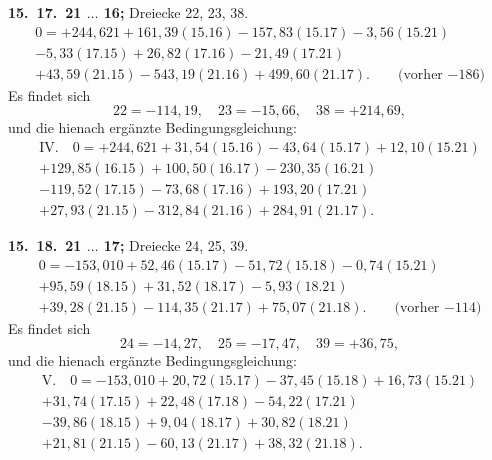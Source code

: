 \documentclass[12pt,a4paper]{article}
\theoremstyle{plain}
\theoremstyle{definition}
\theoremstyle{remark}
\begin{document}
\medskip\noindent
\textbf{15.\ 17.\ 21 $\ldots$ 16;} Dreiecke 22, 23, 38.
\begin{multline*}
0 = +244{,}621 + 161{,}39(15.16) - 157{,}83(15.17) - 3{,}56(15.21)\\
- 5{,}33(17.15) + 26{,}82(17.16) - 21{,}49(17.21)\\
+ 43{,}59(21.15) - 543{,}19(21.16) + 499{,}60(21.17).\qquad\text{(vorher $-186$)}
\end{multline*}
Es findet sich
\[22 = -114{,}19, \quad 23 = -15{,}66, \quad 38 = +214{,}69,\]
und die hienach erg\"anzte Bedingungsgleichung:
\begin{multline*}
\text{IV.}\quad 0 = +244{,}621 + 31{,}54(15.16) - 43{,}64(15.17) + 12{,}10(15.21)\\
+ 129{,}85(16.15) + 100{,}50(16.17) - 230{,}35(16.21)\\
- 119{,}52(17.15) - 73{,}68(17.16) + 193{,}20(17.21)\\
+ 27{,}93(21.15) - 312{,}84(21.16) + 284{,}91(21.17).
\end{multline*}

\medskip\noindent
\textbf{15.\ 18.\ 21 $\ldots$ 17;} Dreiecke 24, 25, 39.
\begin{multline*}
0 = -153{,}010 + 52{,}46(15.17) - 51{,}72(15.18) - 0{,}74(15.21)\\
+ 95{,}59(18.15) + 31{,}52(18.17) - 5{,}93(18.21)\\
+ 39{,}28(21.15) - 114{,}35(21.17) + 75{,}07(21.18).\qquad\text{(vorher $-114$)}
\end{multline*}
Es findet sich
\[24 = -14{,}27, \quad 25 = -17{,}47, \quad 39 = +36{,}75,\]
und die hienach erg\"anzte Bedingungsgleichung:
\begin{multline*}
\text{V.}\quad 0 = -153{,}010 + 20{,}72(15.17) - 37{,}45(15.18) + 16{,}73(15.21)\\
+ 31{,}74(17.15) + 22{,}48(17.18) - 54{,}22(17.21)\\
- 39{,}86(18.15) + 9{,}04(18.17) + 30{,}82(18.21)\\
+ 21{,}81(21.15) - 60{,}13(21.17) + 38{,}32(21.18).
\end{multline*}
\end{document}
